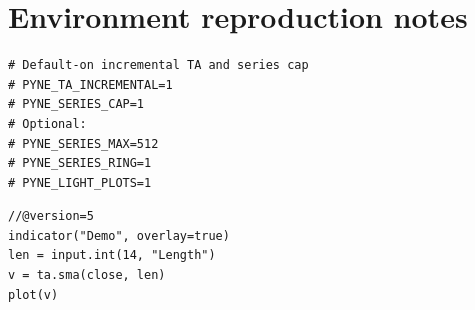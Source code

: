 \documentclass[11pt,a4paper]{article}
\begin{document}
\section{Environment reproduction notes}
\label{app:repro}

\begin{lstlisting}[style=python,caption={Flag surface (interpret path)}]
# Default-on incremental TA and series cap
# PYNE_TA_INCREMENTAL=1
# PYNE_SERIES_CAP=1
# Optional:
# PYNE_SERIES_MAX=512
# PYNE_SERIES_RING=1
# PYNE_LIGHT_PLOTS=1
\end{lstlisting}

\begin{lstlisting}[style=pine,caption={Minimal Pine series / TA example}]
//@version=5
indicator("Demo", overlay=true)
len = input.int(14, "Length")
v = ta.sma(close, len)
plot(v)
\end{lstlisting}



\end{document}
